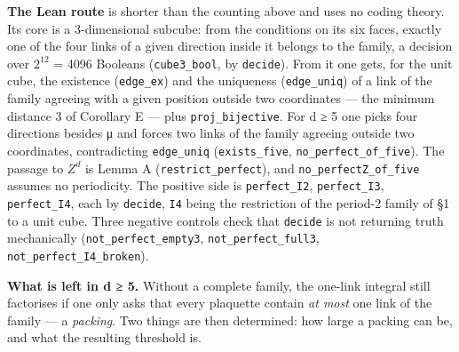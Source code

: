 \documentclass[11pt,a4paper]{article}
\theoremstyle{named}
\begin{document}
\textbf{The Lean route} is shorter than the counting above and uses no coding theory. Its core is a 3-dimensional subcube: from the conditions on its six faces, exactly one of the four links of a given direction inside it belongs to the family, a decision over $2^12$ = 4096 Booleans (\texttt{cube3\_\allowbreak{}bool}, by \texttt{decide}). From it one gets, for the unit cube, the existence (\texttt{edge\_\allowbreak{}ex}) and the uniqueness (\texttt{edge\_\allowbreak{}uniq}) of a link of the family agreeing with a given position outside two coordinates — the minimum distance 3 of Corollary E — plus \texttt{proj\_\allowbreak{}bijective}. For d ≥ 5 one picks four directions besides μ and forces two links of the family agreeing outside two coordinates, contradicting \texttt{edge\_\allowbreak{}uniq} (\texttt{exists\_\allowbreak{}five}, \texttt{no\_\allowbreak{}perfect\_\allowbreak{}of\_\allowbreak{}five}). The passage to $Z^d$ is Lemma A (\texttt{restrict\_\allowbreak{}perfect}), and \texttt{no\_\allowbreak{}perfectZ\_\allowbreak{}of\_\allowbreak{}five} assumes no periodicity. The positive side is \texttt{perfect\_\allowbreak{}I2}, \texttt{perfect\_\allowbreak{}I3}, \texttt{perfect\_\allowbreak{}I4}, each by \texttt{decide}, \texttt{I4} being the restriction of the period-2 family of §1 to a unit cube. Three negative controls check that \texttt{decide} is not returning truth mechanically (\texttt{not\_\allowbreak{}perfect\_\allowbreak{}empty3}, \texttt{not\_\allowbreak{}perfect\_\allowbreak{}full3}, \texttt{not\_\allowbreak{}perfect\_\allowbreak{}I4\_\allowbreak{}broken}).

\textbf{What is left in d ≥ 5.} Without a complete family, the one-link integral still factorises if one only asks that every plaquette contain \textit{at most} one link of the family — a \textit{packing}. Two things are then determined: how large a packing can be, and what the resulting threshold is.
\end{document}
